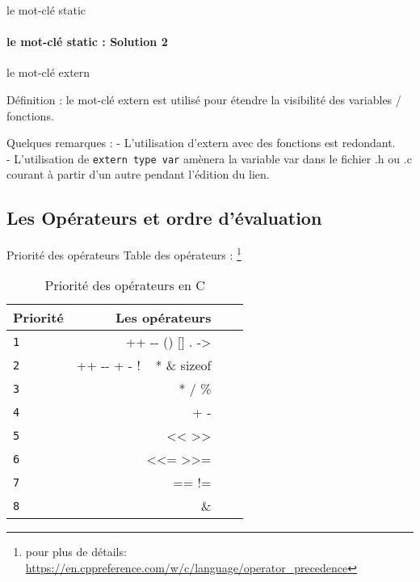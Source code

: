 \documentclass{beamer}
\begin{document}
\begin{darkframes}
	\begin{frame}{le mot-clé static}
		\framesubtitle{le mot-clé static : Solution 2}
		\staticPrivExmplSolutionOne
		\staticPrivExmplSolutionTwo
	\end{frame}
	\begin{frame}{le mot-clé extern}
		\begin{block}{Définition :}
			le mot-clé \alert{extern} est utilisé pour étendre la visibilité des variables / fonctions.
		\end{block}
		\begin{alertblock}{Quelques remarques : }
			- L'utilisation d'\alert{extern} avec des fonctions est redondant.\\
			- L'utilisation de \texttt{extern type var} amènera la variable var dans le fichier \alert{.h} ou \alert{.c} courant à partir d'un autre pendant l'édition du lien.
		\end{alertblock}
	\end{frame}
		
    
    \subsection{Les Opérateurs et ordre d'évaluation}
    \begin{frame}{Priorité des opérateurs}
    	Table des opérateurs : \footnote[frame]{pour plus de détails: \url{https://en.cppreference.com/w/c/language/operator_precedence}}
  		\begin{table}[!b]
	  		{\carlitoTLF %
	  		\begin{tabularx}{\textwidth}{Xrrr}
	  			\textbf{Priorité} & \textbf{Les opérateurs} \\
	  			\toprule
	  			\texttt{1} & ++ -{}- () [] . ->    			\\
	  			\texttt{2} & ++ -{}- + - ! ~ * \& sizeof    \\
	  			\texttt{3} & * / \%  						\\
	  			\texttt{4} & + -							\\
	  			\texttt{5} & <{}< >{}>						\\
	  			\texttt{6} & <{}<= >{}>=					\\
	  			\texttt{7} & == !=							\\
	  			\texttt{8} & \&								\\
	  			\bottomrule
	  		\end{tabularx}}
	  		\caption{Priorité des opérateurs en C}
	  	\end{table}  	
  	\end{frame}
  

\end{darkframes}
\end{document}
